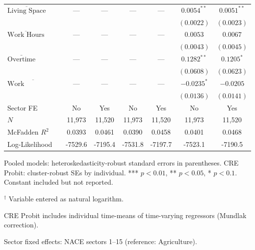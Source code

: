 \begin{landscape}
\begin{table}[htbp]
\begin{tabular}{lcccccc}
    $\overline{\text{Living Space}}$ & --- & --- & --- & --- & $0.0054^{**}$ & $0.0051^{**}$ \\
    \multicolumn{1}{l}{} &  &  &  &  & $(0.0022)$ & $(0.0023)$ \\[2pt]
    $\overline{\text{Work Hours}}$ & --- & --- & --- & --- & $0.0053$ & $0.0067$ \\
    \multicolumn{1}{l}{} &  &  &  &  & $(0.0043)$ & $(0.0045)$ \\[2pt]
    $\bar{\text{Overtime}}$ & --- & --- & --- & --- & $0.1282^{**}$ & $0.1205^{*}$ \\
    \multicolumn{1}{l}{} &  &  &  &  & $(0.0608)$ & $(0.0623)$ \\[2pt]
    $\overline{\text{Work Satisfaction}}$ & --- & --- & --- & --- & $-0.0235^{*}$ & $-0.0205$ \\
    \multicolumn{1}{l}{} &  &  &  &  & $(0.0136)$ & $(0.0141)$ \\[2pt]
  \midrule
  Sector FE & No & Yes & No & Yes & No & Yes \\
  \midrule
  $N$ & 11,973 & 11,520 & 11,973 & 11,520 & 11,973 & 11,520 \\
  McFadden $R^2$ & 0.0393 & 0.0461 & 0.0390 & 0.0458 & 0.0401 & 0.0468 \\
  Log-Likelihood & -7529.6 & -7195.4 & -7531.8 & -7197.7 & -7523.1 & -7190.5 \\
  \bottomrule
\end{tabular}
\smallskip
\begin{minipage}{\linewidth}
\footnotesize
Pooled models: heteroskedasticity-robust standard errors in parentheses. CRE Probit: cluster-robust SEs by individual. *** $p<0.01$, ** $p<0.05$, * $p<0.1$. Constant included but not reported.\par
$^\dagger$ Variable entered as natural logarithm.\par
CRE Probit includes individual time-means of time-varying regressors (Mundlak correction).\par
Sector fixed effects: NACE sectors 1--15 (reference: Agriculture).
\end{minipage}
\end{table}
\end{landscape}
